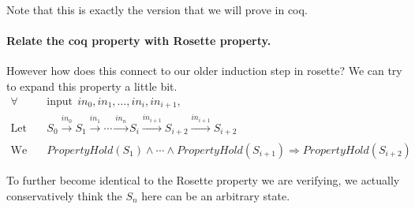 \documentclass{article}
\begin{document}
Note that this is exactly the version that we will prove in coq.




\paragraph{Relate the coq property with Rosette property.}
However how does this connect to our older induction step in rosette?
We can try to expand this property a little bit.
\begin{align*}
\forall &~~ \text{input} ~~ in_0, in_1, \dots, in_i, in_{i+1}, \\
\text{Let} &~~ S_0 \xrightarrow[]{in_0} S_{1} \xrightarrow[]{in_1} \cdots \xrightarrow[]{in_n} S_{i} \xrightarrow[]{in_{i+1}} S_{i+2} \xrightarrow[]{in_{i+1}} S_{i+2} \\
\text{We have} &~~ PropertyHold(S_{1}) \land \cdots \land PropertyHold(S_{i+1}) \Rightarrow PropertyHold(S_{i+2})
\end{align*}

To further become identical to the Rosette property we are verifying, we actually conservatively think the $S_{n}$ here can be an arbitrary state.








\end{document}

